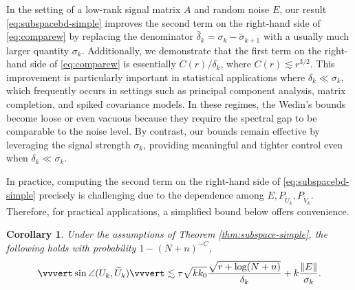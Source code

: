 \documentclass[reqno]{amsart}
\theoremstyle{plain}
\newtheorem{corollary}[theorem]{Corollary}
\theoremstyle{definition}
\begin{document}
In the setting of a low-rank signal matrix $A$ and random noise $E$, our result \eqref{eq:subspacebd-simple} improves the second term on the right-hand side of \eqref{eq:comparew} by replacing the denominator $\hat \delta_{k} = \sigma_{k}- \widetilde \sigma_{k+1}$ with a usually much larger quantity $\sigma_{k}$. Additionally, we demonstrate that the first term on the right-hand side of \eqref{eq:comparew} is essentially $C(r)/\delta_{k}$, where $C(r)\lesssim r^{3/2}$.  This improvement is particularly important in statistical applications where $\delta_k \ll \sigma_k$, which frequently occurs in settings such as principal component analysis, matrix completion, and spiked covariance models. In these regimes, the Wedin's bounds become loose or even vacuous because they require the spectral gap to be comparable to the noise level. By contrast, our bounds remain effective by leveraging the signal strength $\sigma_k$, providing meaningful and tighter control even when $\delta_k \ll \sigma_k$.

In practice, computing the second term on the right-hand side of \eqref{eq:subspacebd-simple} precisely is challenging due to the dependence among $E, P_{\widetilde U_{k}}, P_{\widetilde V_{k}}$. Therefore, for practical applications, a simplified bound below offers convenience.
\begin{corollary}Under the assumptions of Theorem \ref{thm:subspace-simple}, the following holds with probability $1-(N+n)^{-C}$,
\begin{align}\label{eq:simplerbd}
\vvvert \sin \angle ( U_{k}, \widetilde{ U}_{k})\vvvert \lesssim  \tau \sqrt{k k_0} \frac{\sqrt{r+\log(N+n)}}{\delta_{k}} + k\frac{\|E\|}{\sigma_{k}}.
\end{align}
\end{corollary}
\end{document}
